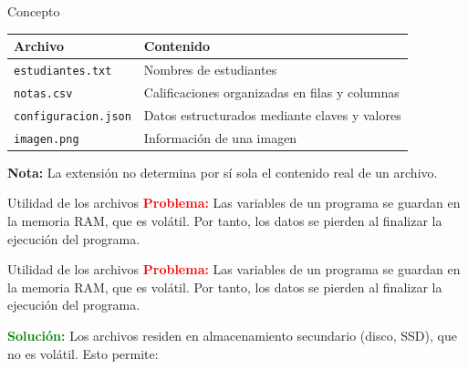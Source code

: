 \documentclass{beamer}
\begin{document}
    \begin{frame}{Concepto}
        \renewcommand{\arraystretch}{1.5}
        \begin{center}
            \footnotesize
            \begin{tabular}{@{}p{3.8cm}p{6.5cm}@{}}
                \toprule
                \textbf{Archivo} & \textbf{Contenido} \\
                \midrule
                \texttt{estudiantes.txt} &
                Nombres de estudiantes \\
                \texttt{notas.csv} &
                Calificaciones organizadas en filas y columnas \\
                \texttt{configuracion.json} &
                Datos estructurados mediante claves y valores \\
                \texttt{imagen.png} &
                Información de una imagen \\
                \bottomrule
            \end{tabular}
        \end{center}
        \vspace{0.5em}
        \textbf{Nota:} La extensión no determina por sí sola el contenido real de un archivo.
    \end{frame}

    \begin{frame}{Utilidad de los archivos}
        \textcolor{red}{\textbf{Problema:}} Las variables de un programa se guardan en la memoria RAM, que es volátil. Por tanto,
        los datos se pierden al finalizar la ejecución del programa.
    \end{frame}

    \begin{frame}[fragile, t]{Utilidad de los archivos}
        \textcolor{red}{\textbf{Problema:}} Las variables de un programa se guardan en la memoria RAM, que es volátil. Por tanto,
        los datos se pierden al finalizar la ejecución del programa.
        
        
        \textcolor{green}{\textbf{Solución:}} Los archivos residen en almacenamiento secundario (disco, SSD), que no es volátil. Esto permite:
    \end{frame}
\end{document}
